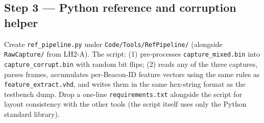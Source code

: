 \documentclass[11pt,letterpaper]{article}
\begin{document}
\subsection{Step 3 --- Python reference and corruption helper}

Create \texttt{ref\_pipeline.py} under \texttt{Code/Tools/RefPipeline/} (alongside \texttt{RawCapture/} from LH2-A). The script: (1) pre-processes \texttt{capture\_mixed.bin} into \texttt{capture\_corrupt.bin} with random bit flips; (2) reads any of the three captures, parses frames, accumulates per-Beacon-ID feature vectors using the same rules as \texttt{feature\_extract.vhd}, and writes them in the same hex-string format as the testbench dump. Drop a one-line \texttt{requirements.txt} alongside the script for layout consistency with the other tools (the script itself uses only the Python standard library).
\end{document}
